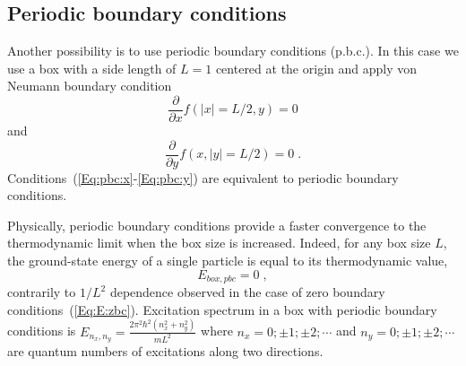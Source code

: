 \documentclass[aps,prl,reprint,onecolumn,superscriptaddress,floatfix,longbibliography]{revtex4-2}
\begin{document}
\subsection{Periodic boundary conditions}
Another possibility is to use periodic boundary conditions (p.b.c.).
In this case we use a box with a side length of $L=1$ centered at the origin and apply von Neumann boundary condition 
\begin{equation}
\frac{\partial }{\partial x} f(|x|=L/2,y)= 0
\label{Eq:pbc:x}
\end{equation}
and
\begin{equation}
\frac{\partial }{\partial y} f(x,|y|=L/2) = 0\;.
\label{Eq:pbc:y}
\end{equation}
Conditions~(\ref{Eq:pbc:x}-\ref{Eq:pbc:y}) are equivalent to periodic boundary conditions.

Physically, periodic boundary conditions provide a faster convergence to the thermodynamic limit when the box size is increased. 
Indeed, for any box size $L$, the ground-state energy of a single particle is equal to its thermodynamic value, 
\begin{equation}
E_{box,pbc} = 0\;,
\label{Eq:E:pbc}
\end{equation}
contrarily to $1/L^2$ dependence observed in the case of zero boundary conditions~(\ref{Eq:E:zbc}). 
Excitation spectrum in a box with periodic boundary conditions is
$E_{n_x, n_y} = \frac{2\pi^2\hbar^2(n_x^2+n_y^2)}{mL^2}$ where $n_x = 0;\pm 1; \pm 2;\cdots$ and 
$n_y = 0;\pm 1; \pm 2;\cdots$ are quantum numbers of excitations along two directions.
\end{document}
